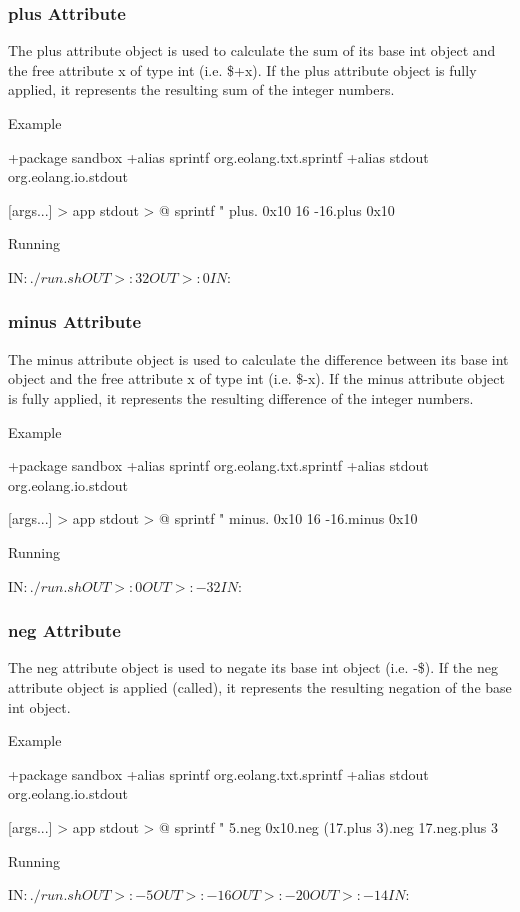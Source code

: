 \documentclass[12pt]{book}
\begin{document}
\subsubsection{plus Attribute}
The plus attribute object is used to calculate the sum of its base int object and the free attribute x of type int (i.e. \$+x).
If the plus attribute object is fully applied, it represents the resulting sum of the integer numbers.

Example
\begin{ffcode}
+package sandbox
+alias sprintf org.eolang.txt.sprintf
+alias stdout org.eolang.io.stdout

[args...] > app
  stdout > @
    sprintf
      "%
      plus.
        0x10
        16
      -16.plus 0x10

Running

IN$: ./run.sh
OUT>: 32
OUT>: 0
IN$: 
\end{ffcode}

\subsubsection{minus Attribute}
The minus attribute object is used to calculate the difference between its base int object and the free attribute x of type int (i.e. \$-x).
If the minus attribute object is fully applied, it represents the resulting difference of the integer numbers.

Example
\begin{ffcode}
+package sandbox
+alias sprintf org.eolang.txt.sprintf
+alias stdout org.eolang.io.stdout

[args...] > app
  stdout > @
    sprintf
      "%
      minus.
        0x10
        16
      -16.minus 0x10

Running

IN$: ./run.sh
OUT>: 0
OUT>: -32
IN$: 
\end{ffcode}

\subsubsection{neg Attribute}
The neg attribute object is used to negate its base int object (i.e. -\$).
If the neg attribute object is applied (called), it represents the resulting negation of the base int object.

Example
\begin{ffcode}
+package sandbox
+alias sprintf org.eolang.txt.sprintf
+alias stdout org.eolang.io.stdout

[args...] > app
  stdout > @
    sprintf
      "%
      5.neg
      0x10.neg
      (17.plus 3).neg
      17.neg.plus 3

Running

IN$: ./run.sh
OUT>: -5
OUT>: -16
OUT>: -20
OUT>: -14
IN$: 
\end{ffcode}
\end{document}
